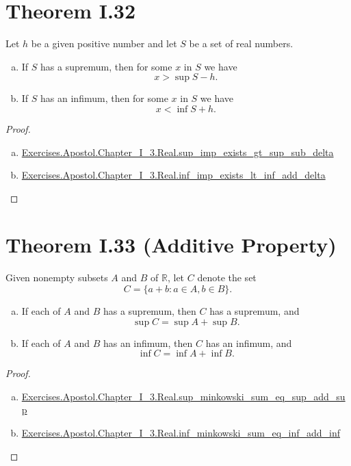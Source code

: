 \documentclass{article}
\newcommand{\ns}{Exercises.Apostol.Chapter\_I\_3.Real}
\newcommand{\link}[1]{\href{../Chapter_I_3.html\#\ns.#1}{\ns.#1}}
\begin{document}
\section*{Theorem I.32}%
\label{sec:theorem-i.32}

Let $h$ be a given positive number and let $S$ be a set of real numbers.
\begin{enumerate}[(a)]
  \item If $S$ has a supremum, then for some $x$ in $S$ we have
    $$x > \sup{S} - h.$$
  \item If $S$ has an infimum, then for some $x$ in $S$ we have
    $$x < \inf{S} + h.$$
\end{enumerate}

\begin{proof}

  \begin{enumerate}[(a)]
    \item \link{sup\_imp\_exists\_gt\_sup\_sub\_delta}
    \item \link{inf\_imp\_exists\_lt\_inf\_add\_delta}
  \end{enumerate}

\end{proof}

\section*{Theorem I.33 (Additive Property)}%
\label{sec:theorem-i.33}

Given nonempty subsets $A$ and $B$ of $\mathbb{R}$, let $C$ denote the set
$$C = \{a + b : a \in A, b \in B\}.$$

\begin{enumerate}[(a)]
  \item If each of $A$ and $B$ has a supremum, then $C$ has a supremum, and
    $$\sup{C} = \sup{A} + \sup{B}.$$
  \item If each of $A$ and $B$ has an infimum, then $C$ has an infimum, and
    $$\inf{C} = \inf{A} + \inf{B}.$$
\end{enumerate}

\begin{proof}

  \begin{enumerate}[(a)]
    \item \link{sup\_minkowski\_sum\_eq\_sup\_add\_sup}
    \item \link{inf\_minkowski\_sum\_eq\_inf\_add\_inf}
  \end{enumerate}

\end{proof}
\end{document}
